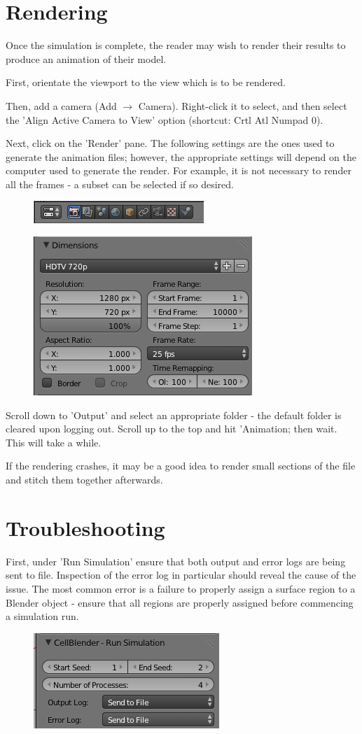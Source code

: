 \documentclass[twoside,a4paper]{refart}
\begin{document}
\section{Rendering}
Once the simulation is complete, the reader may wish to render their results to produce an animation of their model.

First, orientate the viewport to the view which is to be rendered.

Then, add a camera (Add $\to$ Camera). Right-click it to select, and then select the 'Align Active Camera to View' option (shortcut: Crtl Atl Numpad 0).

Next, click on the 'Render' pane. The following settings are the ones used to generate the animation files; however, the appropriate settings will depend on the computer used to generate the render. For example, it is not necessary to render all the frames - a subset can be selected if so desired.

\begin{figure}[H]
    \includegraphics[scale=0.5]{render1.png}
\end{figure}

\begin{figure}[H]
    \includegraphics[scale=0.5]{render2.png}
\end{figure}

Scroll down to 'Output' and select an appropriate folder - the default folder is cleared upon logging out. Scroll up to the top and hit 'Animation; then wait. This will take a while.

If the rendering crashes, it may be a good idea to render small sections of the file and stitch them together afterwards.

\section{Troubleshooting}
 First, under 'Run Simulation' ensure that both output and error logs are being sent to file. Inspection of the error log in particular should reveal the cause of the issue. The most common error is a failure to properly assign a surface region to a Blender object - ensure that all regions are properly assigned before commencing a simulation run.

    \begin{figure}[H]
        \includegraphics[scale=0.5]{trouble1.png}
    \end{figure}
\end{document}
